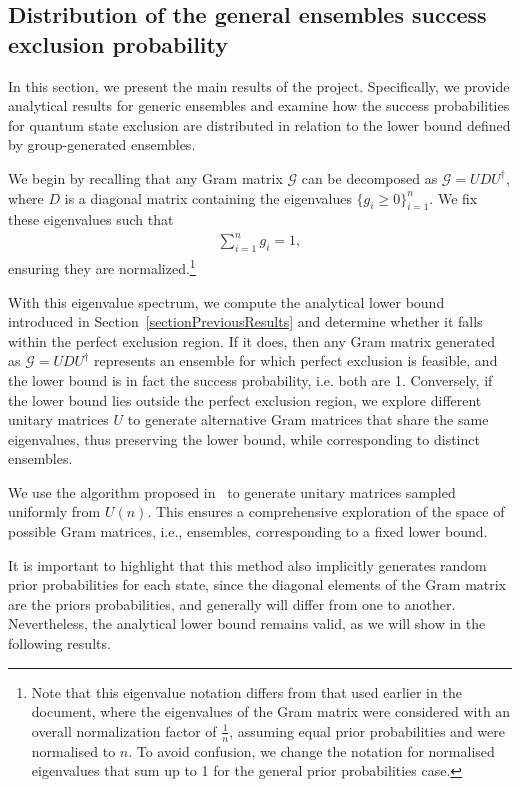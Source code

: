 \documentclass[12pt,letterpaper]{article}
\begin{document}
\subsection{Distribution of the general ensembles success exclusion probability}

\hspace{20pt}In this section, we present the main results of the project. Specifically, we provide analytical results for generic ensembles and examine how the success probabilities for quantum state exclusion are distributed in relation to the lower bound defined by group-generated ensembles.

We begin by recalling that any Gram matrix $ \mathcal{G} $ can be decomposed as $ \mathcal{G} = U D U^\dagger $, where $ D $ is a diagonal matrix containing the eigenvalues $\{g_i\geq0\}_{i=1}^n $. We fix these eigenvalues such that
\begin{align*}
\sum_{i=1}^n g_i = 1,
\end{align*}
ensuring they are normalized.\footnote{Note that this eigenvalue notation differs from that used earlier in the document, where the eigenvalues of the Gram matrix were considered with an overall normalization factor of \( \frac{1}{n} \), assuming equal prior probabilities and were normalised to $n$. To avoid confusion, we change the notation for normalised eigenvalues that sum up to 1 for the general prior probabilities case.}

With this eigenvalue spectrum, we compute the analytical lower bound introduced in Section~\ref{sectionPreviousResults} and determine whether it falls within the perfect exclusion region. If it does, then any Gram matrix generated as $ \mathcal{G} = U D U^\dagger $ represents an ensemble for which perfect exclusion is feasible, and the lower bound is in fact the success probability, i.e. both are 1. Conversely, if the lower bound lies outside the perfect exclusion region, we explore different unitary matrices $ U $ to generate alternative Gram matrices that share the same eigenvalues, thus preserving the lower bound, while corresponding to distinct ensembles.

We use the algorithm proposed in~\cite{UnitaryMatricesGeneration} to generate unitary matrices sampled uniformly from \( U(n) \). This ensures a comprehensive exploration of the space of possible Gram matrices, i.e., ensembles, corresponding to a fixed lower bound.

It is important to highlight that this method also implicitly generates random prior probabilities for each state, since the diagonal elements of the Gram matrix are the priors probabilities, and generally will differ from one to another. Nevertheless, the analytical lower bound remains valid, as we will show in the following results.
\end{document}
